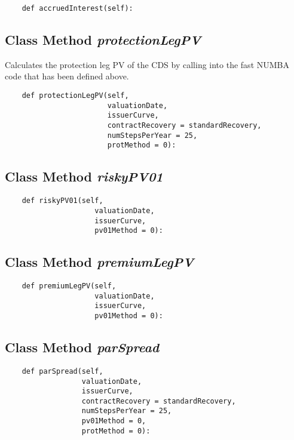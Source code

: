 \documentclass[twoside,11pt]{book}
\begin{document}
\begin{lstlisting}
    def accruedInterest(self):
\end{lstlisting}

\subsection{Class Method {\it protectionLegPV}}
Calculates the protection leg PV of the CDS by calling into the fast NUMBA code that has been defined above. 

\begin{lstlisting}
    def protectionLegPV(self,
                        valuationDate,
                        issuerCurve,
                        contractRecovery = standardRecovery,
                        numStepsPerYear = 25,
                        protMethod = 0):
\end{lstlisting}

\subsection{Class Method {\it riskyPV01}}


\begin{lstlisting}
    def riskyPV01(self,
                     valuationDate,
                     issuerCurve,
                     pv01Method = 0):
\end{lstlisting}

\subsection{Class Method {\it premiumLegPV}}


\begin{lstlisting}
    def premiumLegPV(self,
                     valuationDate,
                     issuerCurve,
                     pv01Method = 0):
\end{lstlisting}

\subsection{Class Method {\it parSpread}}


\begin{lstlisting}
    def parSpread(self,
                  valuationDate,
                  issuerCurve,
                  contractRecovery = standardRecovery,
                  numStepsPerYear = 25,
                  pv01Method = 0,
                  protMethod = 0):
\end{lstlisting}
\end{document}
